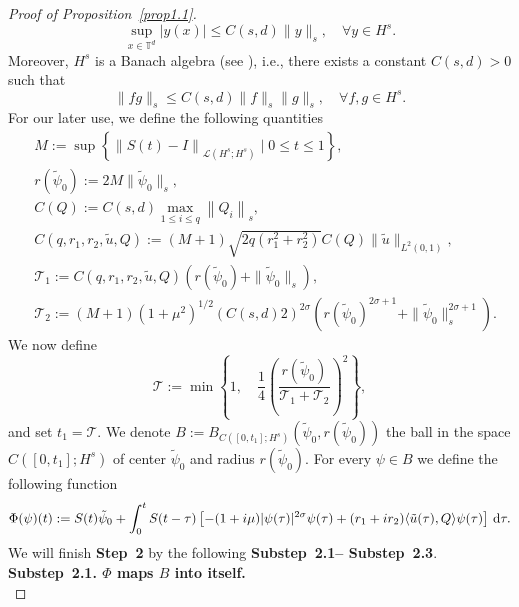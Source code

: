 \documentclass[review]{elsarticle}
\theoremstyle{dotless}
\def\d{{\,\rm d}}
\def \leq{\leqslant}
\numberwithin{equation}{section}
\begin{document}
\begin{proof}[Proof of Proposition~\ref{prop1.1}]
\begin{equation*}
		\sup _{x \in \mathbb{T}^d}|y(x)| \leq C\left(s,d\right)\|y\|_{s}, \quad \forall y \in H^s.
	\end{equation*}
	Moreover, $H^s$ is a Banach algebra (see \cite[Theorem~4.39]{Adams}), i.e., there exists a constant $C\left(s,d\right)>0$ such that
	\begin{equation}\label{eq_BG}
		\|fg\|_s\leq C\left(s,d\right) \|f\|_s \|g\|_s,\quad \forall f, g\in H^s.
	\end{equation}
	For our later use, we define the following quantities
	\begin{equation*}
		\begin{aligned}
			&M:=\sup \left\{\left\|S(t)-I\right\|_{\mathcal{L}\left(H^s; H^s\right)}\mid0 \leq t \leq 1\right\}, \\ 
			&r (\tilde{\psi}_0 ):=2 M \|\tilde{\psi}_0 \|_{s}, \\
			&C(Q):=C(s,d)\max _{1 \leq i \leq q}\left\|Q_i\right\|_{s}, \\ 
			&C(q,r_1,r_2, \tilde{u}, Q):=(M+1) \sqrt{2q( r_1^2+r_2^2)}  C(Q) \|\tilde{u}\|_{L^2(0,1)},\\
			&\mathcal{T}_1 := C(q,r_1,r_2, \tilde{u}, Q)\left(r (\tilde{\psi}_0 )+ \|\tilde{\psi}_0 \|_{s}\right),\\
			&\mathcal{T}_2 := (M+1)(1+\mu^2)^{1/2}\left(C\left(s,d\right) 2\right)^{2\sigma}\left(r(\tilde{\psi}_0)^{2\sigma+1} + \|\tilde{\psi}_0\|_s^{2\sigma+1} \right).
		\end{aligned}
	\end{equation*}
	We now define
	\begin{equation*}
		\mathcal{T}:=\min \left\{1,\quad \frac{1}{4}\left(\frac{r (\tilde{\psi}_0 )}{\mathcal{T}_1+\mathcal{T}_2}\right)^2\right\},
	\end{equation*}
	and set $t_1=\mathcal{T}$.
	We denote $B:=B_{ C\left( [0, t_1 ]; H^s\right)}\left(\tilde{\psi}_0, r (\tilde{\psi}_0 )\right)$ the ball in the space $C\left( [0, t_1 ]; H^s\right)$ of center $\tilde{\psi}_0$ and radius $r (\tilde{\psi}_0 )$. For every $\psi \in B$ we define the following function
	\begin{equation*}
		\Phi(\psi)(t):=S(t) \tilde{\psi}_0+\int_0^t S(t-\tau)\left[-(1+i \mu)|\psi(\tau)|^{2 \sigma} \psi(\tau) +(r_1+ir_2)\langle \tilde{u}(\tau),Q\rangle\psi(\tau)\right] \d \tau.
	\end{equation*}We will finish \textbf{Step~2} by the following \textbf{Substep~2.1-- Substep~2.3}.
	\\
	\textbf{Substep~2.1. $\Phi$ maps $B$ into itself.}
	\\

\end{proof}
\end{document}
